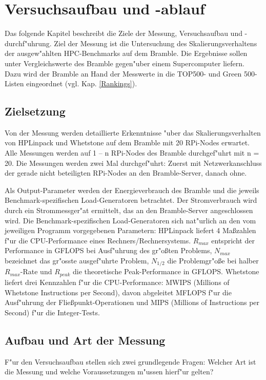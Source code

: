 \chapter{Versuchsaufbau und -ablauf}\label{Kapitel 3}
Das folgende Kapitel beschreibt die Ziele der Messung, Versuchsaufbau und -durchf"uhrung. Ziel der Messung ist die Untersuchung des Skalierungsverhaltens der ausgew"ahlten HPC-Benchmarks auf dem Bramble. Die Ergebnisse sollen unter Vergleichswerte des Bramble gegen"uber einem Supercomputer liefern. Dazu wird der Bramble an Hand der Messwerte in die TOP500- und Green 500-Listen eingeordnet (vgl. Kap. \ref{Rankings}). 

\section{Zielsetzung}
Von der Messung werden detaillierte Erkenntnisse "uber das Skalierungsverhalten von HPLinpack und Whetstone auf dem Bramble mit 20 RPi-Nodes erwartet. Alle Messungen werden auf 1 -- n RPi-Nodes des Bramble durchgef"uhrt mit n = 20. Die Messungen werden zwei Mal durchgef"uhrt: Zuerst mit Netzwerkanschluss der gerade nicht beteiligten RPi-Nodes an den Bramble-Server, danach ohne. 

Als Output-Parameter werden der Energieverbrauch des Bramble und die jeweils Benchmark-spezifischen Load-Generatoren betrachtet. Der Stromverbrauch wird durch ein Strommessger"at ermittelt, das an den Bramble-Server angeschlossen wird. Die Benchmark-spezifischen Load-Generatoren sich nat"urlich an den vom jeweiligen Programm vorgegebenen Parametern: HPLinpack liefert 4 Ma\ss zahlen f"ur die CPU-Performance eines Rechners/Rechnersystems. $R_{max}$ entspricht der Performance in GFLOPS bei Ausf"uhrung des gr"o\ss ten Problems, $N_{max}$ bezeichnet das gr"osste ausgef"uhrte Problem, $N_{1/2}$ die Problemgr"o\ss e bei halber $R_{max}$-Rate und $R_{peak}$ die theoretische Peak-Performance in GFLOPS. Whetstone liefert drei Kennzahlen f"ur die CPU-Performance: MWIPS (Millions of Whetstone Instructions per Second), davon abgeleitet MFLOPS f"ur die Ausf"uhrung der Flie\ss punkt-Operationen und MIPS (Millions of Instructions per Second) f"ur die Integer-Tests. 

\section{Aufbau und Art der Messung}\label{Aufbau}

F"ur den Versuchsaufbau stellen sich zwei grundlegende Fragen: Welcher Art ist die Messung und welche Voraussetzungen m"ussen hierf"ur gelten? 

